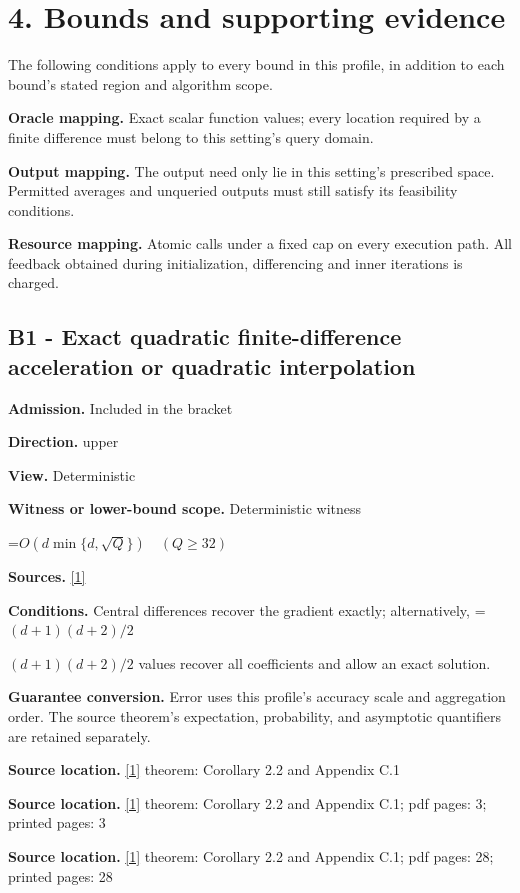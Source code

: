 \documentclass[10pt,a4paper]{article}
\newcommand{\AtlasMath}[1]{\par\begingroup\centering\setbox0=\hbox{$\displaystyle #1$}\ifdim\wd0>1.4\linewidth\typeout{ATLAS WIDE FORMULA: \the\wd0}\fi\ifdim\wd0>\linewidth\resizebox{\linewidth}{!}{\box0}\else\box0\fi\par\endgroup}
\newcommand{\AtlasInlineMath}[1]{\begingroup\setbox0=\hbox{$#1$}\ifdim\wd0>.4\linewidth\endgroup\AtlasMath{#1}\else\endgroup$#1$\fi}
\begin{document}
\section{4. Bounds and supporting evidence}
The following conditions apply to every bound in this profile, in addition to each bound's stated region and algorithm scope.

\textbf{Oracle mapping.} Exact scalar function values; every location required by a finite difference must belong to this setting's query domain.

\textbf{Output mapping.} The output need only lie in this setting's prescribed space. Permitted averages and unqueried outputs must still satisfy its feasibility conditions.

\textbf{Resource mapping.} Atomic calls under a fixed cap on every execution path. All feedback obtained during initialization, differencing and inner iterations is charged.

\subsection{B1 - Exact quadratic finite-difference acceleration or quadratic interpolation}
\textbf{Admission.} Included in the bracket

\textbf{Direction.} upper

\textbf{View.} Deterministic

\textbf{Witness or lower-bound scope.} Deterministic witness

\AtlasMath{O(d\min\{d,\sqrt Q\})\quad(Q\ge32)}
\textbf{Sources.} \href{https://arxiv.org/html/2610.00345v1}{[1]}

\textbf{Conditions.} Central differences recover the gradient exactly; alternatively, \AtlasInlineMath{(d+1)(d+2)/2} values recover all coefficients and allow an exact solution.

\textbf{Guarantee conversion.} Error uses this profile's accuracy scale and aggregation order. The source theorem's expectation, probability, and asymptotic quantifiers are retained separately.

\textbf{Source location.} \href{https://arxiv.org/html/2610.00345v1}{[1]} theorem: Corollary 2.2 and Appendix C.1

\textbf{Source location.} \href{https://arxiv.org/html/2610.00345v1}{[1]} theorem: Corollary 2.2 and Appendix C.1; pdf pages: 3; printed pages: 3

\textbf{Source location.} \href{https://arxiv.org/html/2610.00345v1}{[1]} theorem: Corollary 2.2 and Appendix C.1; pdf pages: 28; printed pages: 28
\end{document}
